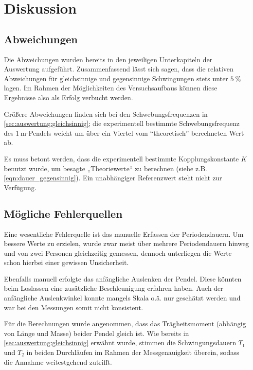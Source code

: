 \section{Diskussion}
\label{sec:diskussion}

\subsection{Abweichungen}

Die Abweichungen wurden bereits in den jeweiligen Unterkapiteln der Auswertung aufgeführt.
Zusammenfassend lässt sich sagen,
dass die relativen Abweichungen
für gleichsinnige und gegensinnige Schwingungen stets unter $\SI{5}{\percent}$ lagen.
Im Rahmen der Möglichkeiten des Versuchsaufbaus können diese Ergebnisse also als Erfolg verbucht werden.

Größere Abweichungen finden sich bei den Schwebungsfrequenzen in \autoref{sec:auswertung:gleichsinnig};
die experimentell bestimmte Schwebungsfrequenz des $\SI{1}{\meter}$-Pendels
weicht um über ein Viertel vom \enquote{theoretisch} berechneten Wert ab.

Es muss betont werden,
dass die experimentell bestimmte Kopplungskonstante $K$ benutzt wurde,
um besagte „Theoriewerte“ zu berechnen (siehe z.B. \autoref{eqn:dauer_gegensinnig}).
Ein unabhängiger Referenzwert steht nicht zur Verfügung.


\subsection{Mögliche Fehlerquellen}

Eine wesentliche Fehlerquelle ist das manuelle Erfassen der Periodendauern.
Um bessere Werte zu erzielen,
wurde zwar meist über mehrere Periodendauern hinweg
und von zwei Personen gleichzeitig
gemessen,
dennoch unterliegen die Werte schon hierbei einer gewissen Unsicherheit.

Ebenfalls manuell erfolgte das anfängliche Auslenken der Pendel.
Diese könnten beim Loslassen eine zusätzliche Beschleunigung erfahren haben.
Auch der anfängliche Auslenkwinkel konnte mangels Skala o.ä. nur geschätzt werden
und war bei den Messungen somit nicht konsistent.

Für die Berechnungen wurde angenommen,
dass das Trägheitsmoment (abhängig von Länge und Masse)
beider Pendel gleich ist.
Wie bereits in \autoref{sec:auswertung:gleichsinnig} erwähnt wurde,
stimmen die Schwingungsdauern $T_1$ und $T_2$ in beiden Durchläufen
im Rahmen der Messgenauigkeit überein,
sodass die Annahme weitestgehend zutrifft.

